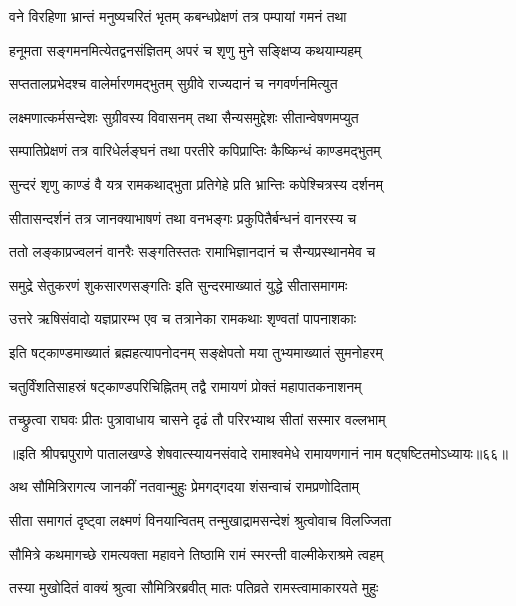 \twolineshloka
{वने विरहिणा भ्रान्तं मनुष्यचरितं भृतम्}
{कबन्धप्रेक्षणं तत्र पम्पायां गमनं तथा}%

\twolineshloka
{हनूमता सङ्गमनमित्येतद्वनसंज्ञितम्}
{अपरं च शृणु मुने सङ्क्षिप्य कथयाम्यहम्}%

\twolineshloka
{सप्ततालप्रभेदश्च वालेर्मारणमद्भुतम्}
{सुग्रीवे राज्यदानं च नगवर्णनमित्युत}%

\twolineshloka
{लक्ष्मणात्कर्मसन्देशः सुग्रीवस्य विवासनम्}
{तथा सैन्यसमुद्देशः सीतान्वेषणमप्युत}%

\twolineshloka
{सम्पातिप्रेक्षणं तत्र वारिधेर्लङ्घनं तथा}
{परतीरे कपिप्राप्तिः कैष्किन्धं काण्डमद्भुतम्}%

\twolineshloka
{सुन्दरं शृणु काण्डं वै यत्र रामकथाद्भुता}
{प्रतिगेहे प्रति भ्रान्तिः कपेश्चित्रस्य दर्शनम्}%

\twolineshloka
{सीतासन्दर्शनं तत्र जानक्याभाषणं तथा}
{वनभङ्गः प्रकुपितैर्बन्धनं वानरस्य च}%

\twolineshloka
{ततो लङ्काप्रज्वलनं वानरैः सङ्गतिस्ततः}
{रामाभिज्ञानदानं च सैन्यप्रस्थानमेव च}%

\twolineshloka
{समुद्रे सेतुकरणं शुकसारणसङ्गतिः}
{इति सुन्दरमाख्यातं युद्धे सीतासमागमः}%

\twolineshloka
{उत्तरे ऋषिसंवादो यज्ञप्रारम्भ एव च}
{तत्रानेका रामकथाः शृण्वतां पापनाशकाः}%

\twolineshloka
{इति षट्काण्डमाख्यातं ब्रह्महत्यापनोदनम्}
{सङ्क्षेपतो मया तुभ्यमाख्यातं सुमनोहरम्}%

\twolineshloka
{चतुर्विंशतिसाहस्रं षट्काण्डपरिचिह्नितम्}
{तद्वै रामायणं प्रोक्तं महापातकनाशनम्}%

\twolineshloka
{तच्छ्रुत्वा राघवः प्रीतः पुत्रावाधाय चासने}
{दृढं तौ परिरभ्याथ सीतां सस्मार वल्लभाम्}%

{॥इति श्रीपद्मपुराणे पातालखण्डे शेषवात्स्यायनसंवादे रामाश्वमेधे रामायणगानं नाम षट्षष्टितमोऽध्यायः॥६६॥}



\twolineshloka
{अथ सौमित्रिरागत्य जानकीं नतवान्मुहुः}
{प्रेमगद्गदया शंसन्वाचं रामप्रणोदिताम्}%

\twolineshloka
{सीता समागतं दृष्ट्वा लक्ष्मणं विनयान्वितम्}
{तन्मुखाद्रामसन्देशं श्रुत्वोवाच विलज्जिता}%

\twolineshloka
{सौमित्रे कथमागच्छे रामत्यक्ता महावने}
{तिष्ठामि रामं स्मरन्ती वाल्मीकेराश्रमे त्वहम्}%

\twolineshloka
{तस्या मुखोदितं वाक्यं श्रुत्वा सौमित्रिरब्रवीत्}
{मातः पतिव्रते रामस्त्वामाकारयते मुहुः}%

